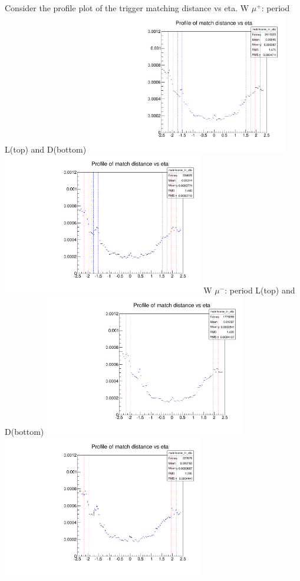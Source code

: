  {
Consider the profile plot of the trigger matching distance vs eta.
}
 {
\colb[T]
W $\mu^+$: period L(top) and D(bottom)
\centering
\includegraphics[width=0.66\textwidth]{dates/20130306/figures/tcone/prof_dataL_w_POS} \\
\includegraphics[width=0.66\textwidth]{dates/20130306/figures/tcone/prof_dataD_w_POS}
W $\mu^-$: period L(top) and D(bottom)
\centering
\includegraphics[width=0.66\textwidth]{dates/20130306/figures/tcone/prof_dataL_w_NEG} \\
\includegraphics[width=0.66\textwidth]{dates/20130306/figures/tcone/prof_dataD_w_NEG}
\cole
}
